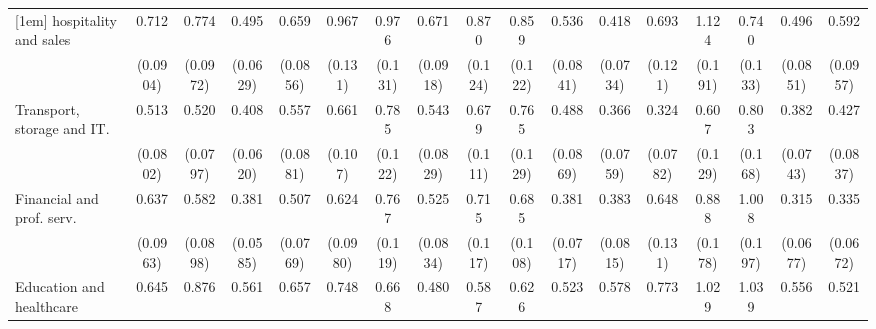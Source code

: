 {\begin{tabular}{l*{16}{c}}
[1em]
hospitality and sales&       0.712\sym{**} &       0.774\sym{*}  &       0.495\sym{***}&       0.659\sym{**} &       0.967         &       0.976         &       0.671\sym{**} &       0.870         &       0.859         &       0.536\sym{***}&       0.418\sym{***}&       0.693\sym{*}  &       1.124         &       0.740         &       0.496\sym{***}&       0.592\sym{**} \\
                    &    (0.0904)         &    (0.0972)         &    (0.0629)         &    (0.0856)         &     (0.131)         &     (0.131)         &    (0.0918)         &     (0.124)         &     (0.122)         &    (0.0841)         &    (0.0734)         &     (0.121)         &     (0.191)         &     (0.133)         &    (0.0851)         &    (0.0957)         \\
[1em]
Transport, storage and IT.&       0.513\sym{***}&       0.520\sym{***}&       0.408\sym{***}&       0.557\sym{***}&       0.661\sym{*}  &       0.785         &       0.543\sym{***}&       0.679\sym{*}  &       0.765         &       0.488\sym{***}&       0.366\sym{***}&       0.324\sym{***}&       0.607\sym{*}  &       0.803         &       0.382\sym{***}&       0.427\sym{***}\\
                    &    (0.0802)         &    (0.0797)         &    (0.0620)         &    (0.0881)         &     (0.107)         &     (0.122)         &    (0.0829)         &     (0.111)         &     (0.129)         &    (0.0869)         &    (0.0759)         &    (0.0782)         &     (0.129)         &     (0.168)         &    (0.0743)         &    (0.0837)         \\
[1em]
Financial and prof. serv.&       0.637\sym{**} &       0.582\sym{***}&       0.381\sym{***}&       0.507\sym{***}&       0.624\sym{**} &       0.767         &       0.525\sym{***}&       0.715\sym{*}  &       0.685\sym{*}  &       0.381\sym{***}&       0.383\sym{***}&       0.648\sym{*}  &       0.888         &       1.008         &       0.315\sym{***}&       0.335\sym{***}\\
                    &    (0.0963)         &    (0.0898)         &    (0.0585)         &    (0.0769)         &    (0.0980)         &     (0.119)         &    (0.0834)         &     (0.117)         &     (0.108)         &    (0.0717)         &    (0.0815)         &     (0.131)         &     (0.178)         &     (0.197)         &    (0.0677)         &    (0.0672)         \\
[1em]
Education and healthcare&       0.645\sym{**} &       0.876         &       0.561\sym{***}&       0.657\sym{**} &       0.748         &       0.668\sym{*}  &       0.480\sym{***}&       0.587\sym{**} &       0.626\sym{**} &       0.523\sym{***}&       0.578\sym{**} &       0.773         &       1.029         &       1.039         &       0.556\sym{**} &       0.521\sym{***}\\

\end{tabular}}
